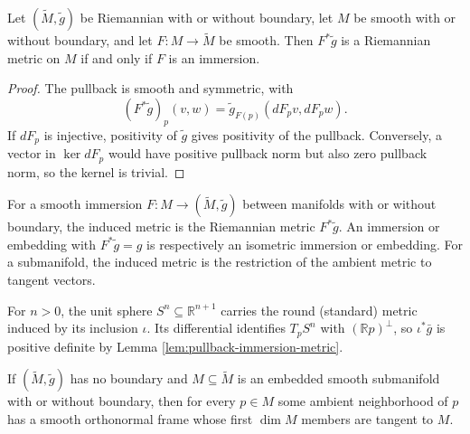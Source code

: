 \begin{lemma}
\label{lem:pullback-immersion-metric}
\leanok
{}
Let $(\widetilde M,\widetilde g)$ be Riemannian with or without boundary, let $M$ be smooth with or without boundary, and let $F:M\to\widetilde M$ be smooth. Then $F^*\widetilde g$ is a Riemannian metric on $M$ if and only if $F$ is an immersion.
\end{lemma}
\begin{proof}
\leanok
{}
\sketch The pullback is smooth and symmetric, with
\[
(F^*\widetilde g)_p(v,w)=\widetilde g_{F(p)}(dF_pv,dF_pw).
\]
If $dF_p$ is injective, positivity of $\widetilde g$ gives positivity of the pullback. Conversely, a vector in $\ker dF_p$ would have positive pullback norm but also zero pullback norm, so the kernel is trivial.
\end{proof}

\begin{definition}
\label{def:induced-metric}
\leanok
{}
For a smooth immersion $F:M\to(\widetilde M,\widetilde g)$ between manifolds with or without boundary, the induced metric is the Riemannian metric $F^*\widetilde g$. An immersion or embedding with $F^*\widetilde g=g$ is respectively an isometric immersion or embedding. For a submanifold, the induced metric is the restriction of the ambient metric to tangent vectors.
\end{definition}

\begin{definition}[Spheres]
\label{ex:spheres}
\leanok
{}
For $n>0$, the unit sphere $S^n\subseteq\mathbb R^{n+1}$ carries the round (standard) metric induced by its inclusion $\iota$. Its differential identifies $T_pS^n$ with $(\mathbb Rp)^\perp$, so $\iota^*\bar g$ is positive definite by Lemma \ref{lem:pullback-immersion-metric}.
\end{definition}

\begin{proposition}
\label{prop:adapted-orthonormal-frames}
If $(\widetilde M,\widetilde g)$ has no boundary and $M\subseteq\widetilde M$ is an embedded smooth submanifold with or without boundary, then for every $p\in M$ some ambient neighborhood of $p$ has a smooth orthonormal frame whose first $\dim M$ members are tangent to $M$.
\end{proposition}

